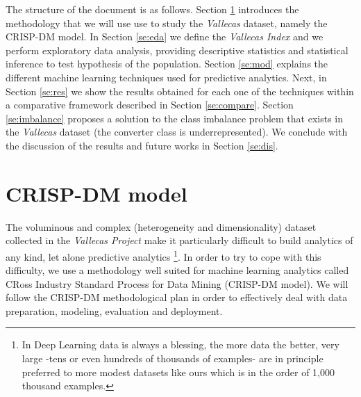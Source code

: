 \documentclass[11pt]{article}
\theoremstyle{definition}
\theoremstyle{remark}
\begin{document}
The structure of the document is as follows. Section \ref{se:crisp} introduces the methodology that we will use use to study the \emph{Vallecas} dataset, namely the CRISP-DM model. In Section \ref{se:eda} we define the \emph{Vallecas Index} and we perform exploratory data analysis, providing descriptive statistics and statistical inference to test hypothesis of the population. Section \ref{se:mod} explains the different machine learning techniques used for predictive analytics. Next, in Section \ref{se:res} we show the results obtained for each one of the techniques within a comparative framework described in Section \ref{se:compare}. Section \ref{se:imbalance} proposes a solution to the class imbalance problem that exists in the \emph{Vallecas} dataset (the converter class is underrepresented). We conclude with the discussion of the results and future works in Section \ref{se:dis}.

\section{CRISP-DM model}
\label{se:crisp}

 The voluminous and complex (heterogeneity and dimensionality) dataset collected in the \emph{Vallecas Project} make it particularly difficult to build analytics of any kind, let alone predictive analytics \footnote{In Deep Learning data is always a blessing, the more data the better, very large -tens or even hundreds of thousands of examples- are in principle preferred to more modest datasets like ours which is in the order of 1,000 thousand examples.}. In order to try to cope with this difficulty, we use a methodology well suited for machine learning analytics called CRoss Industry Standard Process for Data Mining (CRISP-DM model). We will follow the CRISP-DM methodological plan in order to effectively deal with data preparation, modeling, evaluation and deployment.
  
\end{document}
